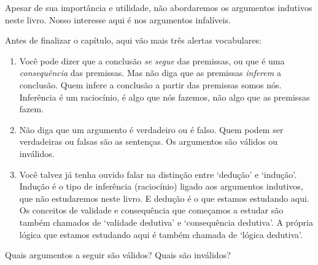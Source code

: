 Apesar de sua importância e utilidade, não abordaremos os argumentos indutivos neste livro.
Nosso interesse aqui é nos argumentos infalíveis.

Antes de finalizar o capítulo, aqui vão mais três alertas vocabulares:
\begin{enumerate}
	\item Você pode dizer que a conclusão \textit{se segue} das premissas, ou que é uma \textit{consequência} das premissas. Mas não diga que as premissas  \textit{inferem} a conclusão.
	Quem infere a conclusão a partir das premissas somos nós.
	 Inferência é um raciocínio, é algo que nós fazemos, não algo que as premissas fazem.
	\item Não diga que um argumento é verdadeiro ou é falso.
		Quem podem ser verdadeiras ou falsas são as sentenças.
		Os argumentos são válidos ou inválidos.
	\item Você talvez já tenha ouvido falar na distinção entre `dedução' e `indução'.
	Indução é o tipo de inferência (raciocínio) ligado aos argumentos indutivos, que não estudaremos neste livro. E dedução é o que estamos estudando aqui.
	Os conceitos de validade e consequência que começamos a estudar são também chamados de `validade dedutiva' e `consequência dedutiva'.
	A própria lógica que estamos estudando aqui é também chamada de `lógica dedutiva'.
\end{enumerate}


\practiceproblems
\problempart
Quais argumentos a seguir são válidos? Quais são inválidos?

